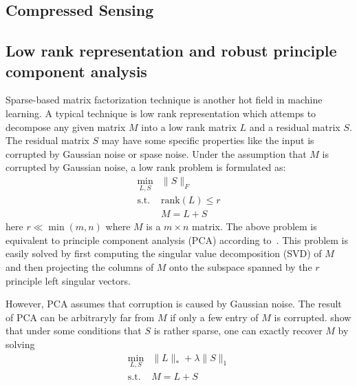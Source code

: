 
\subsection{Compressed Sensing}

\subsection{Low rank representation and robust principle component analysis}
Sparse-based matrix factorization technique is another hot field in machine learning.
A typical technique is low rank representation which attemps to decompose any given matrix $M$ into a low rank matrix $L$ and a residual matrix $S$.
The residual matrix $S$ may have some specific properties like the input is corrupted by Gaussian noise or spase noise.
Under the assumption that $M$ is corrupted by Gaussian noise, a low rank problem is formulated as:
\begin{equation}
\label{eq-lowrank}
\begin{array}{cl}
\min_{L,S} & \|S\|_F\\
\mathrm{s.t.} & \mathrm{rank}(L)\leq r\\
&M=L+S
\end{array}
\end{equation}
here $r\ll \min(m,n)$ where $M$ is a $m\times n$ matrix.
The above problem is equivalent to principle component analysis (PCA) according to~\cite{jolliffe2005principal,wold1987principal}.
This problem is easily solved by first computing the singular value decomposition (SVD) of $M$ and then projecting the columns of $M$ onto the subspace spanned by the $r$ principle left singular vectors.

However, PCA assumes that corruption is caused by Gaussian noise.
The result of PCA can be arbitraryly far from $M$ if only a few entry of $M$ is corrupted.
\cite{wright2009robust,candes2011robust} show that under some conditions that $S$ is rather sparse, one can exactly recover $M$ by solving
\begin{equation}
\label{eq-lowranksparse}
\begin{array}{cl}
\min_{L,S} & \|L\|_* + \lambda \|S\|_1 \\
\mathrm{s.t.} & M = L+S
\end{array}
\end{equation}

